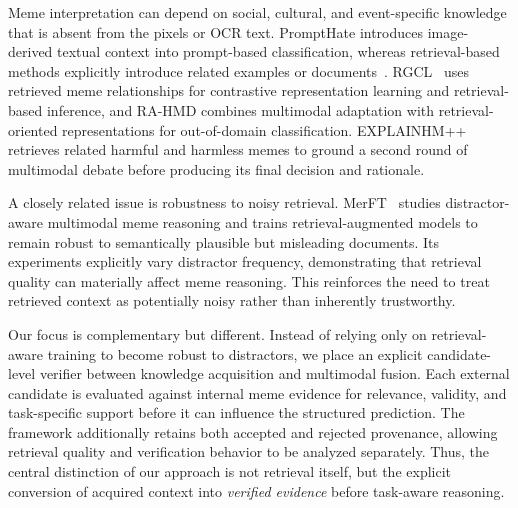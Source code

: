 Meme interpretation can depend on social, cultural, and event-specific
knowledge that is absent from the pixels or OCR text.
PromptHate introduces image-derived textual context into prompt-based
classification, whereas retrieval-based methods explicitly introduce
related examples or documents~\cite{cao2022prompthate}.
RGCL~\cite{mei2024rgcl} uses retrieved meme relationships for contrastive representation
learning and retrieval-based inference, and RA-HMD combines multimodal
adaptation with retrieval-oriented representations for out-of-domain
classification.
EXPLAINHM++ retrieves related harmful and harmless memes to ground a second
round of multimodal debate before producing its final decision and
rationale.

A closely related issue is robustness to noisy retrieval.
MerFT~\cite{lee2026merft} studies distractor-aware multimodal meme
reasoning and trains retrieval-augmented models to remain robust to
semantically plausible but misleading documents.
Its experiments explicitly vary distractor frequency, demonstrating that
retrieval quality can materially affect meme reasoning.
This reinforces the need to treat retrieved context as potentially noisy
rather than inherently trustworthy.

Our focus is complementary but different.
Instead of relying only on retrieval-aware training to become robust to
distractors, we place an explicit candidate-level verifier between
knowledge acquisition and multimodal fusion.
Each external candidate is evaluated against internal meme evidence for
relevance, validity, and task-specific support before it can influence the
structured prediction.
The framework additionally retains both accepted and rejected provenance,
allowing retrieval quality and verification behavior to be analyzed
separately.
Thus, the central distinction of our approach is not retrieval itself, but
the explicit conversion of acquired context into \emph{verified evidence}
before task-aware reasoning.
